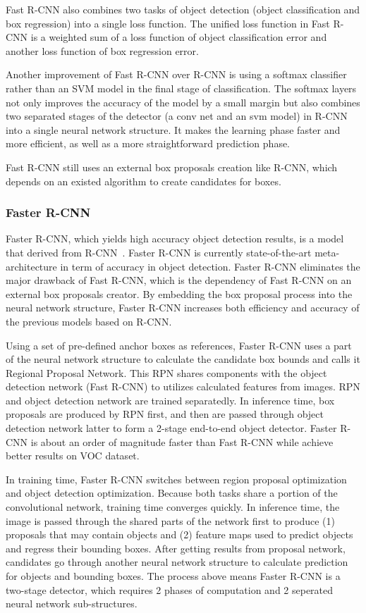 \documentclass[conference]{IEEEtran}
\begin{document}
Fast R-CNN also combines two tasks of object detection (object classification and box regression) into a single loss function. The unified loss function in Fast R-CNN is a weighted sum of a loss function of object classification error and another loss function of box regression error.

Another improvement of Fast R-CNN over R-CNN is using a softmax classifier rather than an SVM model in the final stage of classification. The softmax layers not only improves the accuracy of the model by a small margin but also combines two separated stages of the detector (a conv net and an svm model) in R-CNN into a single neural network structure. It makes the learning phase faster and more efficient, as well as a more straightforward prediction phase. 

Fast R-CNN still uses an external box proposals creation like R-CNN, which depends on an existed algorithm to create candidates for boxes. 

\subsubsection{Faster R-CNN}
Faster R-CNN, which yields high accuracy object detection results, is a model that derived from R-CNN~\cite{girshick2015fast}. Faster R-CNN is currently state-of-the-art meta-architecture in term of accuracy in object detection. Faster R-CNN eliminates the major drawback of Fast R-CNN, which is the dependency of Fast R-CNN on an external box proposals creator. By embedding the box proposal process into the neural network structure, Faster R-CNN increases both efficiency and accuracy of the previous models based on R-CNN.

Using a set of pre-defined anchor boxes as references, Faster R-CNN uses a part of the neural network structure to calculate the candidate box bounds and calls it Regional Proposal Network. This RPN shares components with the object detection network (Fast R-CNN) to utilizes calculated features from images. RPN and object detection network are trained separatedly. In inference time, box proposals are produced by RPN first, and then are passed through object detection network latter to form a 2-stage end-to-end object detector. Faster R-CNN is about an order of magnitude faster than Fast R-CNN while achieve better results on VOC dataset.

In training time, Faster R-CNN switches between region proposal optimization and object detection optimization. Because both tasks share a portion of the convolutional network, training time converges quickly. In inference time, the image is passed through the shared parts of the network first to produce (1) proposals that may contain objects and (2) feature maps used to predict objects and regress their bounding boxes. After getting results from proposal network, candidates go through another neural network structure to calculate prediction for objects and bounding boxes. The process above means Faster R-CNN is a two-stage detector, which requires 2 phases of computation and 2 seperated neural network sub-structures. 
\end{document}
